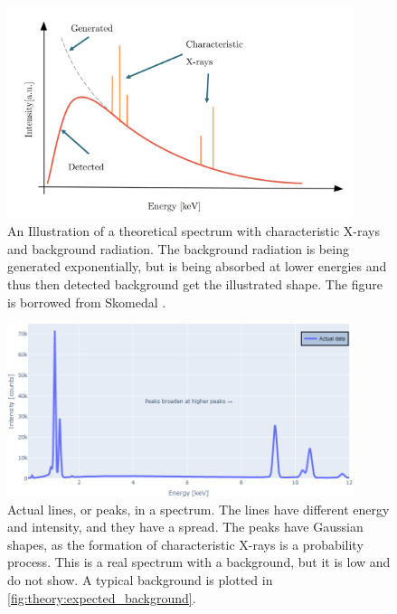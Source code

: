 \begin{figure}[p]
    \centering
    \includegraphics[width=0.9\textwidth]{figures/expected_spectrum_Skomedal.png}
    \caption{
        An Illustration of a theoretical spectrum with characteristic X-rays and background radiation.
        The background radiation is being generated exponentially, but is being absorbed at lower energies and thus then detected background get the illustrated shape.
        The figure is borrowed from Skomedal \cite[Fig. 2.8]{skomedal_eds_2018}.
    }
    \label{fig:theory:expected_spectrum_Skomedal}
\end{figure}


\begin{figure}[p]
    \centering
    \includegraphics[width=0.9\textwidth]{figures/actual_peaks.png}
    \caption{
        Actual lines, or peaks, in a spectrum.
        The lines have different energy and intensity, and they have a spread.
        The peaks have Gaussian shapes, as the formation of characteristic X-rays is a probability process.
        This is a real spectrum with a background, but it is low and do not show.
        A typical background is plotted in \cref{fig:theory:expected_background}.
    }
    \label{fig:theory:actual_peaks}
\end{figure}


